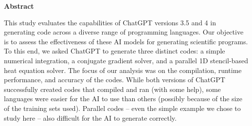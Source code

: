 \documentclass{article}
\begin{document}
\begin{enumerate}
\begin{center}
        \textbf{Abstract}
    \end{center}
  This study evaluates the capabilities of ChatGPT versions 3.5 and 4 in generating code across a diverse range of programming languages. Our objective is to assess the effectiveness of these AI models for generating scientific programs. To this end, we asked ChatGPT to generate three distinct codes: a simple numerical integration, a conjugate gradient solver, and a parallel 1D stencil-based heat equation solver. The focus of our analysis was on the compilation, runtime performance, and accuracy of the codes. While both versions of ChatGPT successfully created codes that compiled and ran (with some help), some languages were easier for the AI to use than others (possibly because of the size of the training sets used). Parallel codes – even the simple example we chose to study here – also difficult for the AI to generate correctly.
\end{enumerate}

\label{LastPage}  
\end{document}
